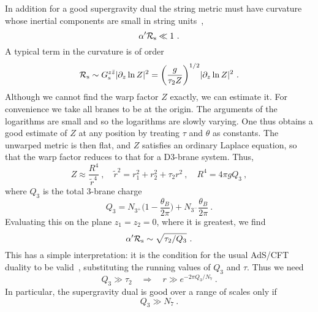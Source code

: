 \documentclass[a4paper,12pt]{article}
\renewcommand{\=}[1]{\bar{#1}}
\begin{document}
In addition for a good supergravity dual the string metric must have curvature whose
inertial components are small in string units~\cite{imsy},
\begin{equation}
\alpha'{\cal R}_{\rm s} \ll 1\ .
\end{equation}
A typical term in the curvature is of order
\begin{equation} 
{\cal R}_{\rm s} \sim G_{\rm s}^{z\bar z} |\partial_z \ln Z|^2
= \biggl( \frac{g}{\tau_2 Z} \biggr)^{1/2} |\partial_z \ln Z|^2 \ .
\label{cond1}
\end{equation}
Although we cannot find the warp factor $Z$ exactly, we can estimate it.  For
convenience we take all branes to be at the origin.  The arguments of the logarithms
are small and so the logarithms are slowly varying. One thus obtains a good
estimate of $Z$ at any position by treating $\tau$ and
$\theta$ as constants.  The unwarped metric is then flat, and $Z$ satisfies an
ordinary Laplace equation, so that the warp factor reduces to that for a D3-brane
system.  Thus,
\begin{equation}
Z\approx \frac{R^4}{ \tilde{r}^4} \ ,\quad
\tilde{r}^2={r_1^2+r_2^2} + {\tau_2} r^2\ ,
\quad R^4=4\pi g Q_3 \ , 
\label{Zapprox}
\end{equation}
where $Q_3$ is the total 3-brane charge
\begin{equation}
Q_3=N_{3^+}\biggl(1-\frac{\theta_B}{2\pi}\biggr)+N_{3^-}\frac{\theta_B}{2\pi} \ .
\end{equation}
Evaluating this on the plane $z_1 =
z_2 = 0$, where it is greatest, we find
\begin{equation}
\alpha'{\cal R}_{\rm s} \sim \sqrt{\tau_2/Q_3}\ .
\end{equation}
This has a simple interpretation: it is the condition for the usual AdS/CFT
duality to be valid~\cite{maldacena}, substituting the running values of $Q_3$ and
$\tau$.  Thus we need
\begin{equation}
Q_3 \gg \tau_2 \quad \Rightarrow \quad r \gg e^{-2\pi Q_3/N_7}\ .\label{sucon1}
\end{equation}
In particular, the supergravity dual is good over a range of scales only if
\begin{equation}
Q_3 \gg N_7\ .  \label{sucon2}
\end{equation}
\end{document}
